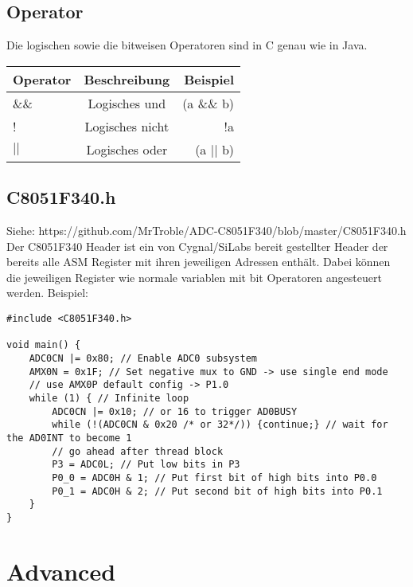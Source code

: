 \documentclass{article}
\begin{document}
\subsection{Operator}
Die logischen sowie die bitweisen Operatoren sind in C genau wie in Java.
\begin{center}
\begin{tabular}{| l | c | r |}
	\hline
	\textbf{Operator} & \textbf{Beschreibung} &  \textbf{Beispiel} \\ \hline
    \&\& & Logisches und & (a \&\& b)\\
    ! & Logisches nicht & !a\\
	\begin{math}
    \vert\vert \end{math} & Logisches oder & (a \begin{math}
    \vert\vert \end{math} b)\\
	\hline
\end{tabular}
\end{center}

\subsection{C8051F340.h}
Siehe: https://github.com/MrTroble/ADC-C8051F340/blob/master/C8051F340.h
\newline\newline
Der C8051F340 Header ist ein von Cygnal/SiLabs bereit gestellter Header der bereits alle ASM Register mit ihren jeweiligen Adressen enthält. Dabei können die jeweiligen Register wie normale variablen mit bit Operatoren angesteuert werden. Beispiel:
\begin{verbatim}
#include <C8051F340.h>

void main() {
    ADC0CN |= 0x80; // Enable ADC0 subsystem
    AMX0N = 0x1F; // Set negative mux to GND -> use single end mode
    // use AMX0P default config -> P1.0
    while (1) { // Infinite loop
        ADC0CN |= 0x10; // or 16 to trigger AD0BUSY
        while (!(ADC0CN & 0x20 /* or 32*/)) {continue;} // wait for the AD0INT to become 1
        // go ahead after thread block
        P3 = ADC0L; // Put low bits in P3
        P0_0 = ADC0H & 1; // Put first bit of high bits into P0.0
        P0_1 = ADC0H & 2; // Put second bit of high bits into P0.1
    }
}
\end{verbatim}

\section{Advanced}
\end{document}
